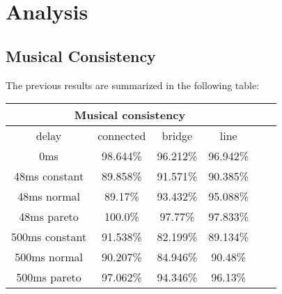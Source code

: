 \documentclass[11pt]{article} %
\theoremstyle{plain}
\theoremstyle{definition}
\begin{document}










\section{Analysis}

\subsection{Musical Consistency}

The previous results are summarized in the following table:

\begin{center}
\begin{tabular}{|c|c|c|c|c|c|}
 \hline
  \multicolumn{4}{|c|}{Musical consistency} \\
 \hline
  delay & connected & bridge & line\\
 \hline
  0ms & 98.644\% & 96.212\% & 96.942\%\\
  48ms constant & 89.858\% & 91.571\% & 90.385\%\\
  48ms normal & 89.17\% & 93.432\% & 95.088\%\\
  48ms pareto & 100.0\% & 97.77\% & 97.833\%\\
  500ms constant & 91.538\% & 82.199\% & 89.134\%\\
  500ms normal & 90.207\% & 84.946\% & 90.48\%\\
  500ms pareto & 97.062\% & 94.346\% & 96.13\%\\
 \hline
\end{tabular}
\end{center}
\end{document}
